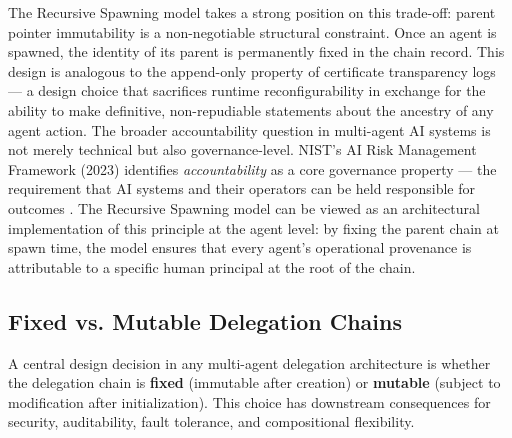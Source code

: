 The Recursive Spawning model takes a strong position on this trade-off: parent pointer immutability is a non-negotiable structural constraint. Once an agent is spawned, the identity of its parent is permanently fixed in the chain record. This design is analogous to the append-only property of certificate transparency logs — a design choice that sacrifices runtime reconfigurability in exchange for the ability to make definitive, non-repudiable statements about the ancestry of any agent action. The broader accountability question in multi-agent AI systems is not merely technical but also governance-level. NIST's AI Risk Management Framework (2023) identifies \textit{accountability} as a core governance property — the requirement that AI systems and their operators can be held responsible for outcomes \cite{nist2023}. The Recursive Spawning model can be viewed as an architectural implementation of this principle at the agent level: by fixing the parent chain at spawn time, the model ensures that every agent's operational provenance is attributable to a specific human principal at the root of the chain.

\subsection{Fixed vs. Mutable Delegation Chains}
\label{sec:delegation}

A central design decision in any multi-agent delegation architecture is whether the delegation chain is \textbf{fixed} (immutable after creation) or \textbf{mutable} (subject to modification after initialization). This choice has downstream consequences for security, auditability, fault tolerance, and compositional flexibility.

